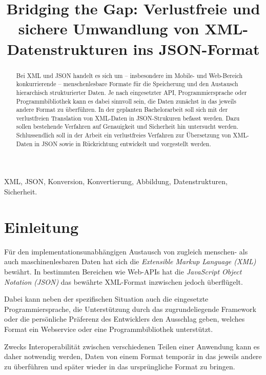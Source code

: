 \documentclass[conference]{template/IEEEtran}
\begin{document}
\title{
Bridging the Gap: Verlustfreie und sichere Umwandlung von XML-Datenstrukturen
ins JSON-Format
}
\author{
}
\maketitle
\begin{abstract}
Bei XML und JSON handelt es sich um -- insbesondere im Mobile- und %
Web-Bereich konkurrierende -- menschenlesbare Formate für die %
Speicherung und den Austausch hierarchisch strukturierter Daten. Je nach
eingesetzter API, Programmiersprache oder Programmbibliothek kann es dabei
sinnvoll sein, die Daten zunächst in das jeweils andere Format zu überführen.
In der geplanten Bachelorarbeit soll sich mit der verlustfreien Translation von
XML-Daten in JSON-Strukuren befasst werden. Dazu sollen bestehende Verfahren
auf Genauigkeit und Sicherheit hin untersucht werden. Schlussendlich soll in
der Arbeit ein verlustfreies Verfahren zur Übersetzung von XML-Daten in
JSON sowie in Rückrichtung entwickelt und vorgestellt werden.
\end{abstract}
\begin{IEEEkeywords}
XML, JSON, Konversion, Konvertierung, Abbildung, Datenstrukturen, Sicherheit.
\end{IEEEkeywords}
\IEEEpeerreviewmaketitle{}
\section{Einleitung}
\label{sec:intro}
Für den implementationsunabhängigen Austausch von zugleich menschen- als auch
maschinenlesbaren Daten hat sich die \emph{Extensible Markup Language (XML)}
bewährt. In bestimmten Bereichen wie Web-APIs hat die \emph{JavaScript Object
Notation (JSON)} das bewährte XML-Format inzwischen jedoch überflügelt.

Dabei kann neben der spezifischen Situation auch die eingesetzte
Programmiersprache, die Unterstützung durch das zugrundeliegende Framework
oder die persönliche Präferenz des Entwicklers den Ausschlag geben, welches
Format ein Webservice oder eine Programmbibliothek unterstützt.

Zwecks Interoperabilität zwischen verschiedenen Teilen einer Anwendung kann es
daher notwendig werden, Daten von einem Format temporär in das jeweils andere
zu überführen und später wieder in das ursprüngliche Format zu bringen.
\end{document}

